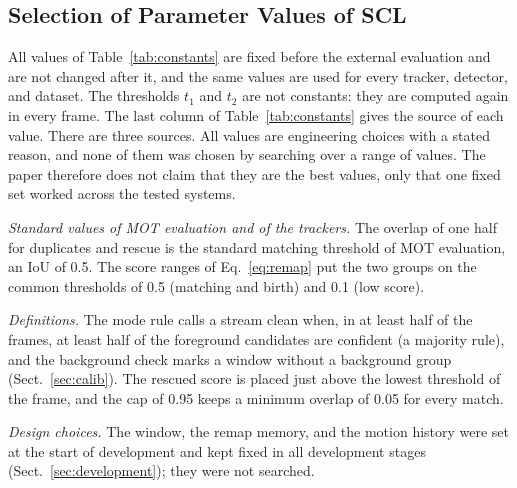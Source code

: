 

\subsection{Selection of Parameter Values of SCL}\label{sec:constants}
All values of Table~\ref{tab:constants} are fixed before the external evaluation and are not
changed after it, and the same values are used for every tracker, detector, and dataset. The
thresholds $t_1$ and $t_2$ are not constants: they are computed again in every frame. The last
column of Table~\ref{tab:constants} gives the source of each value. There are three sources. All
values are engineering choices with a stated reason, and none of them was chosen by searching over
a range of values. The paper therefore does not claim that they are the best values, only that one fixed set
worked across the tested systems.

\emph{Standard values of MOT evaluation and of the trackers.} The overlap of one half for
duplicates and rescue is the standard matching threshold of MOT evaluation, an IoU of 0.5. The score
ranges of Eq.~\eqref{eq:remap} put the two groups on the common thresholds of 0.5 (matching and
birth) and 0.1 (low score).

\emph{Definitions.} The mode rule calls a stream clean when, in at least half of the frames, at
least half of the foreground candidates are confident (a majority rule), and the background check
marks a window without a background group (Sect.~\ref{sec:calib}). The
rescued score is placed just above the lowest threshold of the frame, and the cap of 0.95 keeps a
minimum overlap of 0.05 for every match.

\emph{Design choices.} The window, the remap memory, and the motion history were set at the start
of development and kept fixed in all development stages (Sect.~\ref{sec:development}); they were
not searched.

